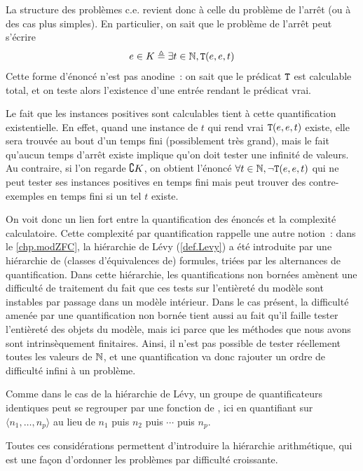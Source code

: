 La structure des problèmes c.e. revient donc à celle du problème de l'arrêt (ou
à des cas plus simples). En particulier, on sait que le problème de l'arrêt peut
s'écrire
\[e \in K \triangleq \exists t \in \mathbb N, {\normalfont\texttt{T}}(e,e,t)\]
Cette forme d'énoncé n'est pas anodine~: on sait que le prédicat ${\normalfont\texttt{T}}$ est
calculable total, et on teste alors l'existence d'une entrée rendant le
prédicat vrai.

Le fait que les instances positives sont calculables tient à cette
quantification existentielle. En effet, quand une instance de $t$ qui rend
vrai ${\normalfont\texttt{T}}(e,e,t)$ existe, elle sera trouvée au bout d'un temps fini
(possiblement très grand), mais le fait qu'aucun temps d'arrêt existe implique
qu'on doit tester une infinité de valeurs. Au contraire, si l'on regarde
$\complement K$, on obtient l'énoncé $\forall t \in \mathbb N, \lnot {\normalfont\texttt{T}}(e,e,t)$
qui ne peut tester ses instances positives en temps fini mais peut trouver des
contre-exemples en temps fini si un tel $t$ existe.

On voit donc un lien fort entre la quantification des énoncés et la complexité
calculatoire. Cette complexité par quantification rappelle une autre notion~:
dans le \cref{chp.modZFC}, la hiérarchie de Lévy (\cref{def.Levy})
a été introduite par une hiérarchie de (classes d'équivalences de) formules,
triées par les alternances de quantification.
Dans cette hiérarchie, les quantifications non bornées amènent une
difficulté de traitement du fait que ces tests sur l'entièreté du modèle sont
instables par passage dans un modèle intérieur. Dans le cas présent, la
difficulté amenée par une quantification non bornée tient aussi au fait qu'il
faille tester l'entièreté des objets du modèle, mais ici parce que les
méthodes que nous avons sont intrinsèquement finitaires. Ainsi, il n'est pas
possible de tester réellement toutes les valeurs de $\mathbb N$, et une quantification
va donc rajouter un ordre de difficulté infini à un problème.

Comme dans le cas de la hiérarchie de Lévy, un groupe de
quantificateurs identiques peut se regrouper par une fonction de
, ici en quantifiant sur $\langle n_1,\ldots,n_p\rangle$
au lieu de $n_1$ puis $n_2$ puis $\cdots$ puis $n_p$.

Toutes ces considérations permettent d'introduire la hiérarchie arithmétique,
qui est une façon d'ordonner les problèmes par difficulté croissante.

